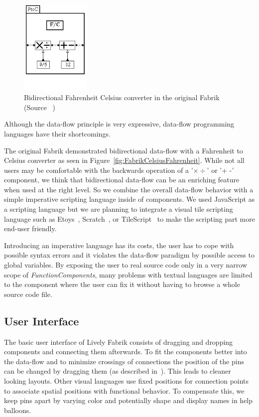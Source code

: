 \documentclass[pdftex, times, 10pt, twocolumn]{article}
\begin{document}
\begin{figure}[]\centering
\includegraphics[width=0.300000\textwidth]{Fabrik_figure2b.png} 

\caption{Bidirectional Fahrenheit Celsius converter in the original Fabrik (Source ~\cite{Ingalls1988FVP}) }
\label{fig:FabrikCelsiusFahrenheitOriginal}
\end{figure}
Although the data-flow principle is very expressive, data-flow programming languages have their shortcomings. 

The original Fabrik demonstrated bidirectional data-flow with a Fahrenheit to Celsius converter as seen in Figure~\ref{fig:FabrikCelsiusFahrenheit}. While not all users may be comfortable with the backwards operation of a  '$\times \div$' or '+ -' component, we think that bidirectional data-flow can be an enriching feature when used at the right level. So we combine the overall data-flow behavior with a simple imperative scripting language inside of components.  We used JavaScript as a scripting language but we are planning to integrate a visual tile scripting language such as Etoys~\cite{Kay2005SEA}, Scratch~\cite{Maloney2004SSP}, or TileScript~\cite{Warth2008TMS} to make the scripting part more end-user friendly.  

Introducing an imperative language has its costs, the user has to cope with possible syntax errors and it violates the data-flow paradigm by possible access to global variables.  By exposing the user to real source code only in a very narrow scope of {\em FunctionComponents}, many problems with textual languages are limited to  the component where the user can fix it without having to browse a whole source code file.  



\subsection{User Interface}
The basic user interface of Lively Fabrik consists of dragging and dropping components and connecting them afterwards. To fit the components better into the data-flow and to minimize crossings of connections the position of the pins can be changed by dragging them (as described in~\cite{Ludolph1988FPE}). This leads to cleaner looking layouts. Other visual languages use fixed positions for connection points to associate spatial positions with functional behavior. To compensate this, we keep pins apart by varying color and potentially shape and display names in help balloons.  
\end{document}
